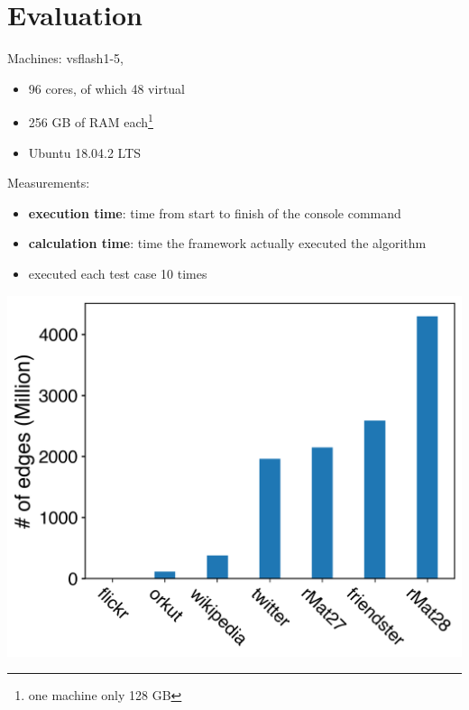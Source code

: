 \documentclass{meetings}
\begin{document}
\section{Evaluation}
\begin{multicols}{2}
\noindent Machines: vsflash1-5, 
\begin{itemize}
	\item 96 cores, of which 48 virtual
	\item 256 GB of RAM each\footnote{\sffamily one machine only 128 GB}
	\item Ubuntu 18.04.2 LTS
\end{itemize}
\noindent Measurements:
\begin{itemize}
	\item \textbf{execution time}: time from start to finish of the console command
	\item \textbf{calculation time}: time the framework actually executed the algorithm
	\item executed each test case 10 times
\end{itemize}

\columnbreak

\begin{center}
	\includegraphics[width=\linewidth]{graphsize.png}
\end{center}



\end{multicols}
\end{document}
